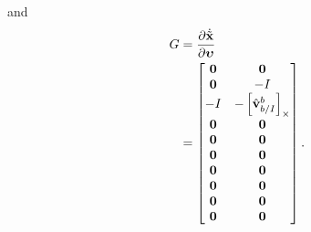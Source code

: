 and
\begin{align}
  G &= \frac{ \partial \dot{\tilde{\x}} }{ \partial \vect{\upsilon} } \\
    &=
    \begin{bmatrix}
      \vect{0} & \vect{0} \\
      \vect{0} & -I \\
      -I & -\skewmat{\hat{\vect{v}}_{b/I}^b} \\
      \vect{0} & \vect{0} \\
      \vect{0} & \vect{0} \\
      \vect{0} & \vect{0} \\
      \vect{0} & \vect{0} \\
      \vect{0} & \vect{0} \\
      \vect{0} & \vect{0} \\
      \vect{0} & \vect{0} 
    \end{bmatrix}.
\end{align}


